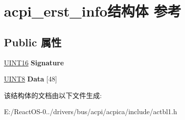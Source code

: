 \hypertarget{structacpi__erst__info}{}\section{acpi\+\_\+erst\+\_\+info结构体 参考}
\label{structacpi__erst__info}
\subsection*{Public 属性}
\begin{DoxyCompactItemize}
\item 
\mbox{\label{structacpi__erst__info_a0c9d569a592118e7721c8588c243f07a}} 
\hyperlink{_processor_bind_8h_a09f1a1fb2293e33483cc8d44aefb1eb1}{U\+I\+N\+T16} {\bfseries Signature}
\item 
\mbox{\label{structacpi__erst__info_a6b51d65b81abc0c5ac3c0fc8a1e9ba71}} 
\hyperlink{_processor_bind_8h_ab27e9918b538ce9d8ca692479b375b6a}{U\+I\+N\+T8} {\bfseries Data} \mbox{[}48\mbox{]}
\end{DoxyCompactItemize}


该结构体的文档由以下文件生成\+:\begin{DoxyCompactItemize}
\item 
E\+:/\+React\+O\+S-\/0../drivers/bus/acpi/acpica/include/actbl1.\+h\end{DoxyCompactItemize}
